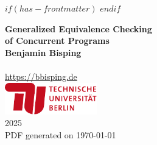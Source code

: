 $if(has-frontmatter)$
\frontmatter
$endif$
%
\makeatletter
  \let\ps@plain\ps@empty
\makeatother
\setlength{\headheight}{15pt}
\addtolength{\headwidth}{\marginparwidth}
\fancyhf{}
\fancyhead[LO]{\nouppercase{\rightmark}}
\fancyhead[RO]{\thepage}
\fancyhead[LE]{\thepage}
\fancyhead[RE]{\nouppercase{\leftmark}}
\renewcommand{\headrulewidth}{0pt}
\pagestyle{fancy}
\begin{titlepage}
    \begin{center}
        \vspace{1.5cm}
        {\huge\bfseries Generalized Equivalence Checking \\ of Concurrent Programs\\}
        \vspace{1.5cm}
        \vfill
        {\Large\bfseries Benjamin Bisping}\\
        \\[5pt]
        \url{https://bbisping.de}\\[14pt]
        \vfill
        \includegraphics[width=0.3\textwidth]{img/tu-berlin-logo-long-red.pdf}\\[5pt]
        \vspace{3cm}
        {2025}\\
        \vspace{1cm}
        {\small PDF generated on \today}
    \end{center}
\end{titlepage}
\restoregeometry
%


\let\mainmatterforreal=\mainmatter
\renewcommand{\mainmatter}{}
